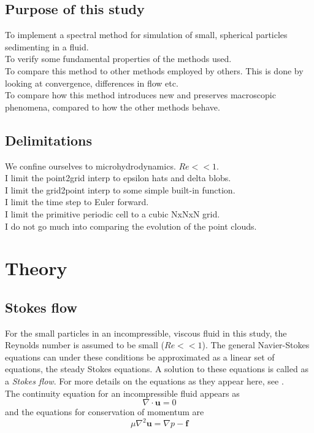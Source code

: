 \documentclass[a4paper,
twoside=false,abstract=false,numbers=noenddot,
titlepage=false,headings=small,parskip=half,version=last]{scrartcl}
\begin{document}
\subsection{Purpose of this study}
To implement a spectral method for simulation of small, spherical particles sedimenting in a fluid.\\
To verify some fundamental properties of the methods used.\\
To compare this method to other methods employed by others. This is done by looking at convergence, differences in flow etc.\\
To compare how this method introduces new and preserves macroscopic phenomena, compared to how the other methods behave.
\subsection{Delimitations}
We confine ourselves to microhydrodynamics. $Re<<1$.\\
I limit the point2grid interp to epsilon hats and delta blobs.\\
I limit the grid2point interp to some simple built-in function.\\
I limit the time step to Euler forward.\\
I limit the primitive periodic cell to a cubic NxNxN grid.\\
I do not go much into comparing the evolution of the point clouds.\\
\section{Theory}
\subsection{Stokes flow}
For the small particles in an incompressible, viscous fluid in this study, the Reynolds number is assumed to be small ($Re<<1$). The general Navier-Stokes equations can under these conditions be approximated as a linear set of equations, the steady Stokes equations. A solution to these equations is called as a \emph{Stokes flow}. For more details on the equations as they appear here, see \cite{guazzellibook}.\\
The continuity equation for an incompressible fluid appears as
\begin{equation}
\nabla \cdot \mathbf{u} = 0 \label{eq:incompressible}
\end{equation}
and the equations for conservation of momentum are
\begin{equation}
\mu \nabla^2 \mathbf{u} = \nabla p - \mathbf{f} \label{eq:stokesequations}
\end{equation}
\end{document}
